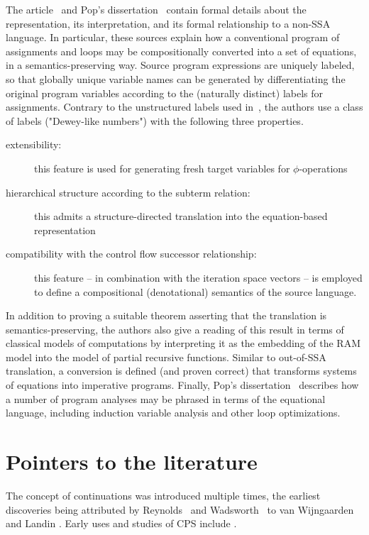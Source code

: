 The article~\cite{PopJS2007} and Pop's
dissertation~\cite{PopDissertation} contain formal details about the
representation, its interpretation, and its formal relationship to a
non-SSA language. In particular, these sources explain how a
conventional program of assignments and loops may be compositionally
converted into a set of equations, in a semantics-preserving
way. Source program expressions are uniquely labeled, so that globally
unique variable names can be generated by differentiating the original
program variables according to the (naturally distinct) labels for
assignments.  Contrary to the unstructured labels used
in~\cite{NielsonNielsonHanking:POPA}, the authors use a class of
labels ("Dewey-like numbers") with the following three properties.
\begin{description}
\item[extensibility:] this feature
is used for generating fresh target variables for $\phi$-operations
\item[hierarchical structure according to the subterm relation:]
   this admits a structure-directed translation into the
   equation-based representation
\item [compatibility with the control flow successor relationship:] 
  this feature -- in combination
with the iteration space vectors -- is employed to define a compositional
(denotational) semantics of the source language. 
\end{description}
In addition to proving a suitable theorem asserting that the
translation is semantics-preserving, the authors also give a reading
of this result in terms of classical models of computations by
interpreting it as the embedding of the RAM model into the model of
partial recursive functions. Similar to out-of-SSA translation, a
conversion is defined (and proven correct) that transforms systems of
equations into imperative programs. Finally, Pop's
dissertation~\cite{PopDissertation} describes how a number of program
analyses may be phrased in terms of the equational language, including
induction variable analysis and other loop optimizations.


\section{Pointers to the literature}
\label{section:Part1:Semantics:Discussion}

The concept of continuations was introduced multiple times, the
earliest discoveries being attributed by
Reynolds~\cite{Reynolds:LSC1993} and Wadsworth~\cite{Wadsworth00} to
van Wijngaarden
\cite{vanWijngaarden1966} and Landin \cite{Landin1965}. Early uses
and studies of CPS include \cite{Reynolds:1972,Plotkin75}.  

